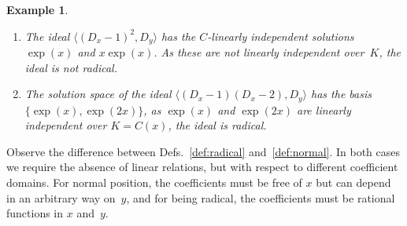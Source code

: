 \documentclass[a4paper,draft]{amsart}
\def\<#1>{\langle#1\rangle}
\newtheorem{ex}[thm]{Example}
\begin{document}
\begin{ex}
  \begin{enumerate}
  \item The ideal $\<(D_x-1)^2,D_y>$ has the $C$-linearly independent
    solutions $\exp(x)$ and $x\exp(x)$.
    As these are not linearly independent over~$K$, the ideal is not radical.
  \item The solution space of the ideal $\<(D_x-1)(D_x-2),D_y>$ has the basis $\{\exp(x),\exp(2x)\}$,
    as $\exp(x)$ and $\exp(2x)$ are linearly independent over $K=C(x)$, the ideal is radical.
  \end{enumerate}
\end{ex}

Observe the difference between Defs.~\ref{def:radical} and~\ref{def:normal}.
In both cases we require the absence of linear relations, but with respect to
different coefficient domains. For normal position, the coefficients must be
free of $x$ but can depend in an arbitrary way on~$y$, and for being radical,
the coefficients must be rational functions in $x$ and~$y$.
\end{document}
